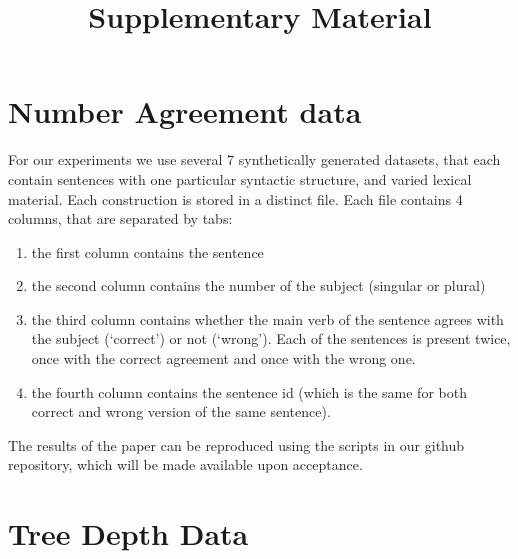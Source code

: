 \documentclass{article}
\title{Supplementary Material}
\date{}
\author{}
\begin{document}
\maketitle

\section*{Number Agreement data}

For our experiments we use several 7 synthetically generated datasets, that each contain sentences with one particular syntactic structure, and varied lexical material.
Each construction is stored in a distinct file.
Each file contains 4 columns, that are separated by tabs:\begin{enumerate}
    \item the first column contains the sentence
    \item the second column  contains the number of the subject (singular or plural)
    \item the third column contains whether the main verb of the sentence agrees with the subject (`correct') or not (`wrong'). Each of the sentences is present twice, once with the correct agreement and once with the wrong one.
    \item the fourth column contains the sentence id (which is the same for both correct and wrong version of the same sentence).
\end{enumerate}

The results of the paper can be reproduced using the scripts in our github repository, which will be made available upon acceptance.


\section*{Tree Depth Data}
\end{document}
